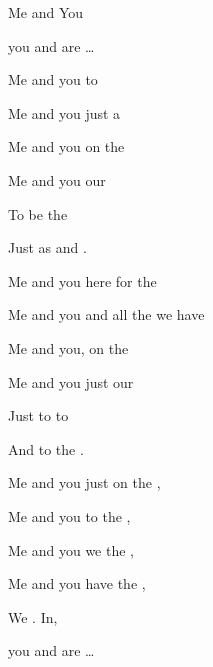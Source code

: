 \begin{SBSong}{Me and You}
\begin{SBVerse}
    you and  are  \ldots
  \end{SBVerse}  
  \CBPageBrk
  \begin{SBVerse}
    Me and you  to 
    
    Me and you just  a 
    
    Me and you  on the 
    
    Me and you  our 
    
    To be  the 
    
    Just as  and .
  \end{SBVerse}  
  \WBPageBrk
  \begin{SBVerse}  
    Me and you here  for the 
    
    Me and you and all the  we have 
    
    Me and you,  on the 
    
    Me and you just  our 
    
    Just to  to 
    
    And to  the .
  \end{SBVerse}  
  \begin{SBVerse}  
    Me and you just  on the ,

    Me and you  to the ,
    
    Me and you we  the ,
    
    Me and you have  the ,
    
    We . In,
    
    you and  are  \ldots 

  \end{SBVerse}
\end{SBSong}


